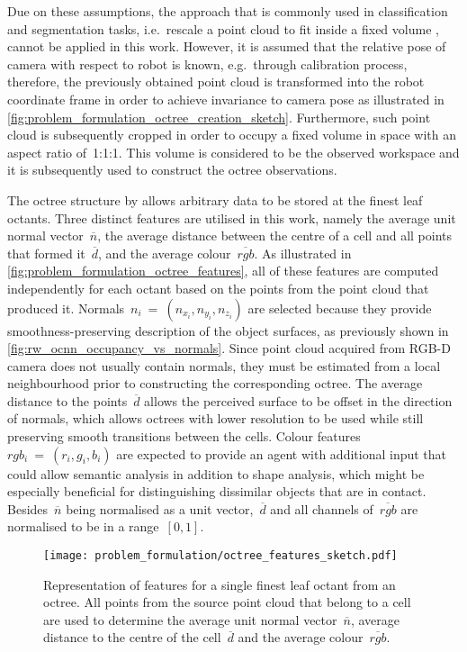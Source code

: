 Due on these assumptions, the approach that is commonly used in classification and segmentation tasks, i.e.~rescale a point cloud to fit inside a fixed volume \cite{wang_o-cnn_2017}, cannot be applied in this work. However, it is assumed that the relative pose of camera with respect to robot is known, e.g.~through calibration process, therefore, the previously obtained point cloud is transformed into the robot coordinate frame in order to achieve invariance to camera pose as illustrated in \autoref{fig:problem_formulation_octree_creation_sketch}. Furthermore, such point cloud is subsequently cropped in order to occupy a fixed volume in space with an aspect ratio of~1:1:1. This volume is considered to be the observed workspace and it is subsequently used to construct the octree observations.

The octree structure by \citet{wang_o-cnn_2017} allows arbitrary data to be stored at the finest leaf octants. Three distinct features are utilised in this work, namely the average unit normal vector~\(\overline{n}\), the average distance between the centre of a cell and all points that formed it~\(\overline{d}\), and the average colour~\(\overline{rgb}\). As illustrated in \autoref{fig:problem_formulation_octree_features}, all of these features are computed independently for each octant based on the points from the point cloud that produced it. Normals~\(n_{i}~{=}~(n_{x_{i}},n_{y_{i}},n_{z_{i}})\) are selected because they provide smoothness-preserving description of the object surfaces, as previously shown in \autoref{fig:rw_ocnn_occupancy_vs_normals}. Since point cloud acquired from RGB-D camera does not usually contain normals, they must be estimated from a local neighbourhood prior to constructing the corresponding octree. The average distance to the points~\(\overline{d}\) allows the perceived surface to be offset in the direction of normals, which allows octrees with lower resolution to be used while still preserving smooth transitions between the cells. Colour features~\(rgb_{i}~{=}~(r_{i},g_{i},b_{i})\) are expected to provide an agent with additional input that could allow semantic analysis in addition to shape analysis, which might be especially beneficial for distinguishing dissimilar objects that are in contact. Besides~\(\overline{n}\) being normalised as a unit vector,~\(\overline{d}\) and all channels of~\(\overline{rgb}\) are normalised to be in a range~\([0, 1]\).

\begin{figure}[ht]
    \centering
    \texttt{[image: problem\_formulation/octree\_features\_sketch.pdf]}
    \caption{Representation of features for a single finest leaf octant from an octree. All points from the source point cloud that belong to a cell are used to determine the average unit normal vector~\(\overline{n}\), average distance to the centre of the cell~\(\overline{d}\) and the average colour~\(\overline{rgb}\).}
    \label{fig:problem_formulation_octree_features}
\end{figure}


